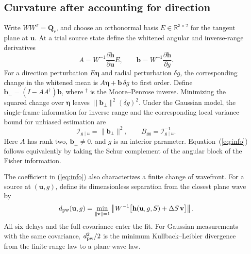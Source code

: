 \documentclass[journal]{IEEEtran}
\newcommand{\bu}{\mathbf{u}}
\newcommand{\bh}{\mathbf{h}}
\newcommand{\bQ}{\mathbf{Q}}
\newcommand{\RR}{\mathbb{R}}
\begin{document}
\subsection{Curvature after accounting for direction}
Write \(WW^T=\bQ_r\), and choose an orthonormal basis \(E\in\RR^{3\times2}\) for the tangent plane at \(\bu\). At a trial source state define the whitened angular and inverse-range derivatives
\begin{equation}
 A=W^{-1}\frac{\partial\bh}{\partial\bu}E,\qquad
 \mathbf b=W^{-1}\frac{\partial\bh}{\partial g}.
 \label{eq:ab}
\end{equation}
For a direction perturbation \(E\boldsymbol\eta\) and radial perturbation \(\delta g\), the corresponding change in the whitened mean is \(A\boldsymbol\eta+\mathbf b\,\delta g\) to first order. Define \(\mathbf b_\perp=(I-AA^\dagger)\mathbf b\), where \({}^\dagger\) is the Moore--Penrose inverse. Minimizing the squared change over \(\boldsymbol\eta\) leaves \(\|\mathbf b_\perp\|^2(\delta g)^2\). Under the Gaussian model, the single-frame information for inverse range and the corresponding local variance bound for unbiased estimation are
\begin{equation}
 \mathcal I_{g\mid u}=\|\mathbf b_\perp\|^2,\qquad B_{gg}=\mathcal I_{g\mid u}^{-1}.
 \label{eq:info}
\end{equation}
Here \(A\) has rank two, \(\mathbf b_\perp\ne0\), and \(g\) is an interior parameter. Equation~(\ref{eq:info}) follows equivalently by taking the Schur complement of the angular block of the Fisher information.

The coefficient in (\ref{eq:info}) also characterizes a finite change of wavefront. For a source at \((\bu,g)\), define its dimensionless separation from the closest plane wave by
\begin{equation}
 d_{\rm pw}(\bu,g)=\min_{\|\mathbf v\|=1}
   \left\|W^{-1}\big[\bh(\bu,g,S)+\Delta S\,\mathbf v\big]\right\|.
 \label{eq:distance}
\end{equation}
All six delays and the full covariance enter the fit. For Gaussian measurements with the same covariance, \(d_{\rm pw}^2/2\) is the minimum Kullback--Leibler divergence from the finite-range law to a plane-wave law.
\end{document}

